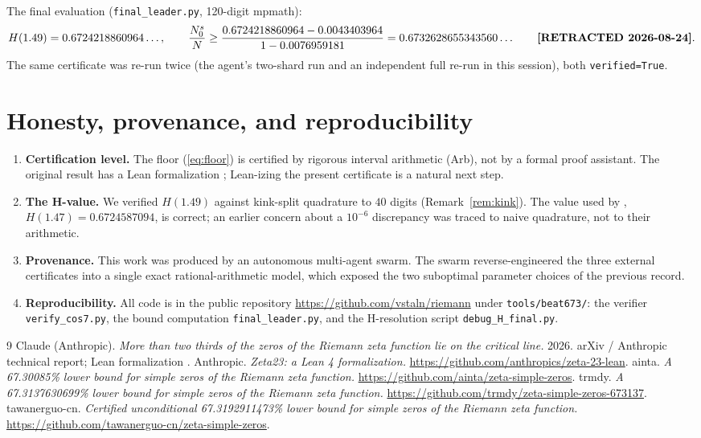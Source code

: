 \documentclass[11pt]{article}
\newcommand{\Nc}{N_0^s}
\newcommand{\N}{N}
\newcommand{\repo}{\url{https://github.com/vstaln/riemann}}
\begin{document}
The final evaluation (\texttt{final\_leader.py}, 120-digit mpmath):
\[
 H(1.49) = 0.6724218860964\ldots,\qquad
 \frac{\Nc}{\N}\ge \frac{0.6724218860964 - 0.0043403964}{1 - 0.0076959181}
 = 0.6732628655343560\ldots \qquad \text{\textbf{[RETRACTED 2026-08-24]}} .
\]
The same certificate was re-run twice (the agent's two-shard run and an
independent full re-run in this session), both
\texttt{verified=True}.

\section{Honesty, provenance, and reproducibility}
\label{sec:honesty}

\begin{enumerate}
\item \textbf{Certification level.} The floor (\ref{eq:floor}) is certified by
  rigorous interval arithmetic (Arb), not by a formal proof assistant.  The
  original result \cite{claude2026} has a Lean formalization
  \cite{lean2026}; Lean-izing the present certificate is a natural next step.
\item \textbf{The H-value.} We verified $H(1.49)$ against kink-split
  quadrature to $40$ digits (Remark~\ref{rem:kink}).  The value used by
  \cite{tawanerguo}, $H(1.47)=0.6724587094$, is correct; an earlier concern
  about a $10^{-6}$ discrepancy was traced to naive quadrature, not to their
  arithmetic.
\item \textbf{Provenance.} This work was produced by an autonomous multi-agent
  swarm.  The swarm reverse-engineered the three external certificates into a
  single exact rational-arithmetic model, which exposed the two suboptimal
  parameter choices of the previous record.
\item \textbf{Reproducibility.} All code is in the public repository
  \repo{} under \texttt{tools/beat673/}: the verifier
  \texttt{verify\_cos7.py}, the bound computation \texttt{final\_leader.py},
  and the H-resolution script \texttt{debug\_H\_final.py}.
\end{enumerate}

\begin{thebibliography}{9}
Claude (Anthropic).
\emph{More than two thirds of the zeros of the Riemann zeta function lie on
the critical line.}
2026. arXiv / Anthropic technical report; Lean formalization \cite{lean2026}.
Anthropic.
\emph{Zeta23: a Lean 4 formalization.}
\url{https://github.com/anthropics/zeta-23-lean}.
ainta.
\emph{A 67.30085\% lower bound for simple zeros of the Riemann zeta
function.}
\url{https://github.com/ainta/zeta-simple-zeros}.
trmdy.
\emph{A 67.3137630699\% lower bound for simple zeros of the Riemann zeta
function.}
\url{https://github.com/trmdy/zeta-simple-zeros-673137}.
tawanerguo-cn.
\emph{Certified unconditional 67.3192911473\% lower bound for simple zeros of
the Riemann zeta function.}
\url{https://github.com/tawanerguo-cn/zeta-simple-zeros}.
\end{thebibliography}
\end{document}
